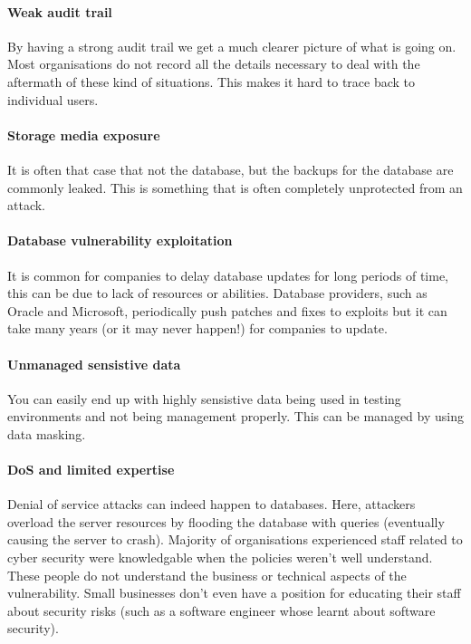 \paragraph{Weak audit trail} By having a strong audit trail we get a much clearer picture of what is going on. Most organisations do not record all the details necessary to deal with the aftermath of these kind of situations. This makes it hard to trace back to individual users. 

\paragraph{Storage media exposure} It is often that case that not the database, but the backups for the database are commonly leaked. This is something that is often completely unprotected from an attack. 

\paragraph{Database vulnerability exploitation} It is common for companies to delay database updates for long periods of time, this can be due to lack of resources or abilities. Database providers, such as Oracle and Microsoft, periodically push patches and fixes to exploits but it can take many years (or it may never happen!) for companies to update.

\paragraph{Unmanaged sensistive data} You can easily end up with highly sensistive data being used in testing environments and not being management properly. This can be managed by using data masking.

\paragraph{DoS and limited expertise} Denial of service attacks can indeed happen to databases. Here, attackers overload the server resources by flooding the database with queries (eventually causing the server to crash). Majority of organisations experienced staff related to cyber security were knowledgable when the policies weren't well understand. These people do not understand the business or technical aspects of the vulnerability. Small businesses don't even have a position for educating their staff about security risks (such as a software engineer whose learnt about software security).

